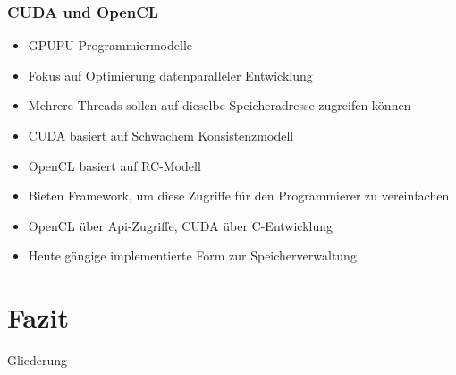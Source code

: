 \documentclass{sikslides}
\begin{document}
\begin{frame}
	\frametitle{CUDA und OpenCL}
		\begin{itemize}

		\item GPUPU Programmiermodelle \bigskip
		\item Fokus auf Optimierung datenparalleler Entwicklung \bigskip
		\item Mehrere Threads sollen auf dieselbe Speicheradresse zugreifen können \bigskip
		\item CUDA basiert auf Schwachem Konsistenzmodell \bigskip
		\item OpenCL basiert auf RC-Modell \bigskip
		\item Bieten Framework, um diese Zugriffe für den Programmierer zu vereinfachen \bigskip
		\item OpenCL über Api-Zugriffe, CUDA über C-Entwicklung

\bigksip
\item Heute gängige implementierte Form zur Speicherverwaltung

	\end{itemize}
\end{frame}

\section{Fazit}
\begin{frame}{Gliederung}
   
    	\tableofcontents[currentsection, subsectionstyle=show/show/hide]
\end{frame}
\end{document}
